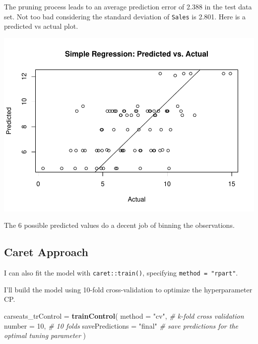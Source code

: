 \documentclass[]{book}
\newenvironment{Shaded}{\begin{snugshade}}{\end{snugshade}}
\newcommand{\CommentTok}[1]{\textcolor[rgb]{0.56,0.35,0.01}{\textit{#1}}}
\newcommand{\DataTypeTok}[1]{\textcolor[rgb]{0.13,0.29,0.53}{#1}}
\newcommand{\DecValTok}[1]{\textcolor[rgb]{0.00,0.00,0.81}{#1}}
\newcommand{\KeywordTok}[1]{\textcolor[rgb]{0.13,0.29,0.53}{\textbf{#1}}}
\newcommand{\NormalTok}[1]{#1}
\newcommand{\OperatorTok}[1]{\textcolor[rgb]{0.81,0.36,0.00}{\textbf{#1}}}
\newcommand{\StringTok}[1]{\textcolor[rgb]{0.31,0.60,0.02}{#1}}
\begin{document}
The pruning process leads to an average prediction error of 2.388 in the test data set. Not too bad considering the standard deviation of \texttt{Sales} is 2.801. Here is a predicted vs actual plot.

\begin{Shaded}
\end{Shaded}

\includegraphics{data-sci_files/figure-latex/unnamed-chunk-70-1.pdf}

The 6 possible predicted values do a decent job of binning the observations.

\hypertarget{caret-approach-1}{%
\subsection{Caret Approach}\label{caret-approach-1}}

I can also fit the model with \texttt{caret::train()}, specifying \texttt{method\ =\ "rpart"}.

I'll build the model using 10-fold cross-validation to optimize the hyperparameter CP.

\begin{Shaded}
\begin{Highlighting}[]
\NormalTok{carseats_trControl =}\StringTok{ }\KeywordTok{trainControl}\NormalTok{(}
   \DataTypeTok{method =} \StringTok{"cv"}\NormalTok{,  }\CommentTok{# k-fold cross validation}
   \DataTypeTok{number =} \DecValTok{10}\NormalTok{,  }\CommentTok{# 10 folds}
   \DataTypeTok{savePredictions =} \StringTok{"final"}       \CommentTok{# save predictions for the optimal tuning parameter}
\NormalTok{)}
\end{Highlighting}
\end{Shaded}
\end{document}
